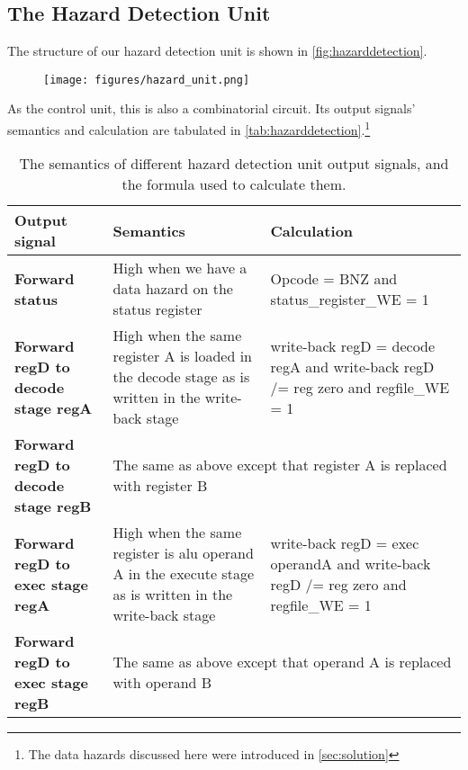 \documentclass[11pt]{article}
\begin{document}
\subsection{The Hazard Detection Unit}
\label{subsec:hazarddetection} 
The structure of our hazard detection unit is shown in
\autoref{fig:hazarddetection}.

\begin{figure}[ht]
  \centering
  \texttt{[image: figures/hazard\_unit.png]}
  \caption{\label{fig:hazarddetection} }
\end{figure}

As the control unit, this is also a combinatorial circuit. Its output
signals' semantics and calculation are tabulated in
\autoref{tab:hazarddetection}.\footnote{The data hazards discussed
  here were introduced in \autoref{sec:solution}}

\begin{table}[htbp]
  \centering
  \begin{tabular}{|p{60pt}|p{150pt}|p{150pt}|}
    \hline
    {\bf Output signal} & {\bf Semantics} & {\bf Calculation} \\ \hline
    {\bf Forward status} & High when we have a data hazard on the status register & Opcode = BNZ and status\_register\_WE = 1 \\ \hline
    {\bf Forward regD to decode stage regA} & High when the same register A is loaded in the decode stage as is written in the write-back stage & write-back regD = decode regA and write-back regD /= reg zero and regfile\_WE = 1 \\ \hline
    {\bf Forward regD to decode stage regB} & \multicolumn{2}{|p{300pt}|}{The same as above except that register A is replaced with register B} \\ \hline
    {\bf Forward regD to exec stage regA} & High when the same register is alu operand A in the execute stage as is written in the write-back stage & write-back regD = exec operandA and write-back regD /= reg zero and regfile\_WE = 1 \\ \hline
    {\bf Forward regD to exec stage regB} & \multicolumn{2}{|p{300pt}|}{The same as above except that operand A is replaced with operand B} \\ \hline    
  \end{tabular}
  \caption{The semantics of different hazard detection unit output signals, and the formula used to calculate them.}
  \label{tab:hazarddetection}
\end{table}
\end{document}
